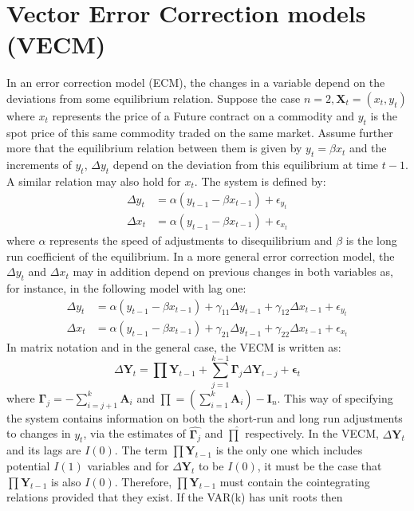 \documentclass[11pt,a4,twosided,singlespacing,titlepagenumber=on]{scrreprt}
\newcommand{\matr}[1]{\mathbf{#1}} %
\numberwithin{equation}{chapter} %
\theoremstyle{remark}
\begin{document}
\section{Vector Error Correction models (VECM)}
In an error correction model (ECM), the changes in a variable depend on the deviations from some equilibrium relation. Suppose the case $n=2, \matr{X}_t = (x_t, y_t)$ where $x_t$ represents the price of a Future contract on a commodity and $y_t$ is the spot price of this same commodity traded on the same market. Assume further more that the equilibrium relation between them is given by $y_t = \beta x_t$ and the increments of $y_t$, $\Delta y_t$ depend on the deviation from this equilibrium at time $t-1$. A similar relation may also hold for $x_t$. The system is defined by:
\begin{align*}
\Delta y_t &= \alpha (y_{t-1} - \beta x_{t-1}) + \epsilon_{y_t} \\
\Delta x_t &= \alpha (y_{t-1} - \beta x_{t-1}) + \epsilon_{x_t}
\end{align*}
where $\alpha$ represents the speed of adjustments to disequilibrium and $\beta$ is the long run coefficient of the equilibrium. In a more general error correction model, the $\Delta y_t$ and $\Delta x_t$ may in addition depend on previous changes in both variables as, for instance, in the following model with lag one:
\begin{align*}
\Delta y_t &= \alpha (y_{t-1} - \beta x_{t-1}) + \gamma_{11} \Delta y_{t-1} + \gamma_{12} \Delta x_{t-1} + \epsilon_{y_t} \\
\Delta x_t &= \alpha (y_{t-1} - \beta x_{t-1}) + \gamma_{21} \Delta y_{t-1} + \gamma_{22} \Delta x_{t-1} + \epsilon_{x_t}
\end{align*}
In matrix notation and in the general case, the VECM is written as:
$$\Delta \matr{Y}_t = \prod \matr{Y}_{t-1} + \sum_{j=1}^{k-1} \matr{\Gamma}_j \Delta \matr{Y}_{t-j} + \matr{\epsilon}_t $$
where $\matr{\Gamma}_j = - \sum_{i=j+1}^k \matr{A}_i$ and $\prod = \left(\sum_{i=1}^k \matr{A}_i \right) - \matr{I}_n$. This way of specifying the system contains information on both the short-run and long run adjustments to changes in $y_t$, via the estimates of $\hat{\matr{\Gamma}_j}$ and $\hat{\prod}$ respectively. In the VECM, $\Delta \matr{Y}_t$ and its lags are $I(0)$. The term $\prod \matr{Y}_{t-1}$ is the only one which includes potential $I(1)$ variables and for $\Delta \matr{Y}_t$ to be $I(0)$, it must be the case that $\prod \matr{Y}_{t-1}$ is also $I(0)$. Therefore, $\prod \matr{Y}_{t-1}$ must contain the cointegrating relations provided that they exist. If the VAR(k) has unit roots then 
\end{document}
